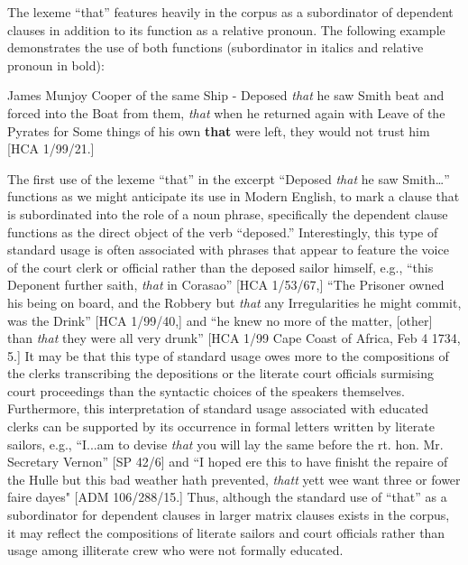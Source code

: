   The lexeme “that” features heavily in the corpus as a subordinator of dependent clauses in addition to its function as a relative pronoun. The following example demonstrates the use of both functions (subordinator in italics and relative pronoun in bold):

James Munjoy Cooper of the same Ship - Deposed \textit{that} he saw Smith beat and forced into the Boat from them, \textit{that} when he returned again with Leave of the Pyrates for Some things of his own \textbf{that} were left, they would not trust him [HCA 1/99/21.]

The first use of the lexeme “that” in the excerpt “Deposed \textit{that} he saw Smith…” functions as we might anticipate its use in Modern English, to mark a clause that is subordinated into the role of a noun phrase, specifically the dependent clause functions as the direct object of the verb “deposed.” Interestingly, this type of standard usage is often associated with phrases that appear to feature the voice of the court clerk or official rather than the deposed sailor himself, e.g., “this Deponent further saith, \textit{that} in Corasao” [HCA 1/53/67,] “The Prisoner owned his being on board, and the Robbery but \textit{that} any Irregularities he might commit, was the Drink” [HCA 1/99/40,] and “he knew no more of the matter, [other] than \textit{that} they were all very drunk” [HCA 1/99 Cape Coast of Africa, Feb 4 1734, 5.] It may be that this type of standard usage owes more to the compositions of the clerks transcribing the depositions or the literate court officials surmising court proceedings than the syntactic choices of the speakers themselves. Furthermore, this interpretation of standard usage associated with educated clerks can be supported by its occurrence in formal letters written by literate sailors, e.g., “I...am to devise \textit{that} you will lay the same before the rt. hon. Mr. Secretary Vernon” [SP 42/6] and “I hoped ere this to have finisht the repaire of the Hulle but this bad weather hath prevented, \textit{thatt} yett wee want three or fower faire dayes" [ADM 106/288/15.] Thus, although the standard use of “that” as a subordinator for dependent clauses in larger matrix clauses exists in the corpus, it may reflect the compositions of literate sailors and court officials rather than usage among illiterate crew who were not formally educated. 

